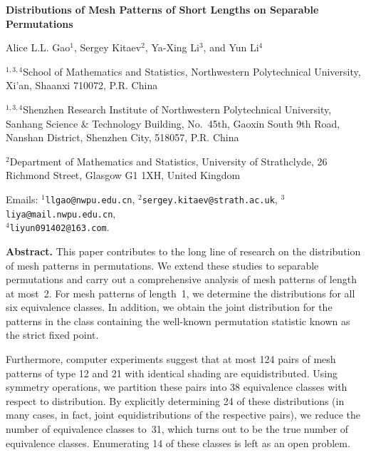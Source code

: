 \documentclass[12pt]{article}
\begin{document}
	
\begin{center}
	{\large \bf Distributions of Mesh Patterns of Short Lengths on Separable Permutations}
\end{center}
	
\begin{center}
Alice L.L. Gao$^{1}$, Sergey Kitaev$^{2}$, Ya-Xing Li$^{3}$, and Yun Li$^{4}$\\[6pt]
\end{center}
\begin{small}
$^{1,3,4}$School of Mathematics and Statistics, Northwestern Polytechnical University, Xi'an, Shaanxi 710072, P.R. China

$^{1,3,4}$Shenzhen Research Institute of Northwestern Polytechnical University, Sanhang Science $\&$ Technology Building, No.\ 45th, Gaoxin South 9th Road, Nanshan District,   Shenzhen City,  518057,  P.R. China

$^{2}$Department of Mathematics and Statistics, University of Strathclyde, 26 Richmond Street, Glasgow G1 1XH, United Kingdom 

\noindent
Emails: $^{1}${\tt llgao@nwpu.edu.cn},
$^{2}${\tt sergey.kitaev@strath.ac.uk},
$^{3}${\tt liya@mail.nwpu.edu.cn}, \\
$^{4}${\tt liyun091402@163.com}.
\end{small}
	
\noindent\textbf{Abstract.}
This paper contributes to the long line of research on the distribution of mesh patterns in permutations. We extend these studies to separable permutations and carry out a comprehensive analysis of mesh patterns of length at most~2. For mesh patterns of length~1, we determine the distributions for all six equivalence classes. In addition, we obtain the joint distribution for the patterns in the class containing the well-known permutation statistic known as the strict fixed point.

Furthermore, computer experiments suggest that at most 124 pairs of mesh patterns of type 12 and 21 with identical shading are equidistributed. Using symmetry operations, we partition these pairs into 38 equivalence classes with respect to distribution. By explicitly determining 24 of these distributions (in many cases, in fact, joint equidistributions of the respective pairs), we reduce the number of equivalence classes to~31, which turns out to be the true number of equivalence classes. Enumerating 14 of these classes is left as an open problem.
\end{document}
